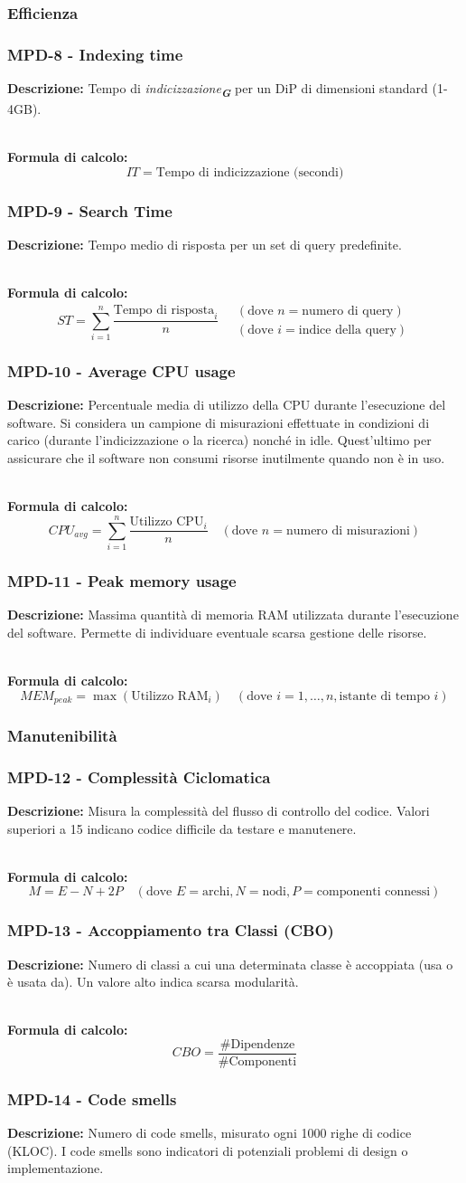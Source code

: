 \documentclass[a4paper,12pt]{article}
\newcommand{\glossario}[1]{\textit{#1}\textsubscript{\textbf{\textit{\textcolor{lightblack}{G}}}}}
\newcommand{\metricdef}[3]{
    \subsubsection*{#1 - #2}
    \textbf{Descrizione:} #3
}
\newcommand{\metricformula}[1]{
    \\[0.5em]
    \textbf{Formula di calcolo:}
    \begin{equation*}
        #1
    \end{equation*}
}
\begin{document}
\subsubsection{Efficienza}

\metricdef{MPD-8}{Indexing time}{Tempo di \glossario{indicizzazione} per un DiP di dimensioni standard (1-4GB).}
\metricformula{IT = \text{Tempo di indicizzazione (secondi)}}

\metricdef{MPD-9}{Search Time}{Tempo medio di risposta per un set di query predefinite.}
\metricformula{ST = \sum_{i=1}^{n} \frac{\text{Tempo di risposta}_i}{n} \quad \begin{array}{l} (\text{dove } n = \text{numero di query}) \\ (\text{dove }i = \text{indice della query}) \end{array}}

\metricdef{MPD-10}{Average CPU usage}{Percentuale media di utilizzo della CPU durante l'esecuzione del software. Si considera un campione di misurazioni effettuate in condizioni di carico (durante l'indicizzazione o la ricerca) nonché in idle. Quest'ultimo per assicurare che il software non consumi risorse inutilmente quando non è in uso.}
\metricformula{CPU_{avg} = \sum_{i=1}^{n} \frac{\text{Utilizzo CPU}_i}{n} \quad (\text{dove }n = \text{numero di misurazioni})}

\metricdef{MPD-11}{Peak memory usage}{Massima quantità di memoria RAM utilizzata durante l'esecuzione del software. Permette di individuare eventuale scarsa gestione delle risorse.}
\metricformula{MEM_{peak} = \max(\text{Utilizzo RAM}_i) \quad (\text{dove }i = 1, \dots, n, \text{istante di tempo } i)}

\subsubsection{Manutenibilità}

\metricdef{MPD-12}{Complessità Ciclomatica}{Misura la complessità del flusso di controllo del codice. Valori superiori a 15 indicano codice difficile da testare e manutenere.}
\metricformula{M = E - N + 2P \quad (\text{dove } E=\text{archi}, N=\text{nodi}, P=\text{componenti connessi})}

\metricdef{MPD-13}{Accoppiamento tra Classi (CBO)}{Numero di classi a cui una determinata classe è accoppiata (usa o è usata da). Un valore alto indica scarsa modularità.}
\metricformula{CBO = \frac{\#\text{Dipendenze}}{\#\text{Componenti}}}

\metricdef{MPD-14}{Code smells}{Numero di code smells, misurato ogni 1000 righe di codice (KLOC). I code smells sono indicatori di potenziali problemi di design o implementazione.}
\end{document}
